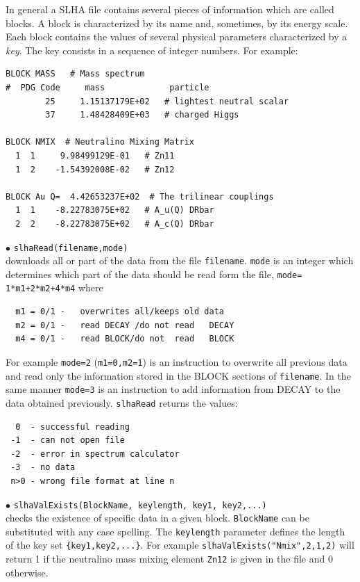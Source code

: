 \documentclass[12pt,a4paper]{article}
\begin{document}
In general a SLHA file contains several pieces of information 
which are called blocks. A block is characterized by its name and,
sometimes, by its energy scale. Each block contains the values of several physical parameters 
characterized by a {\it key}. The  key consists in a sequence of 
integer numbers. For example:
{\small
\begin{verbatim}
BLOCK MASS   # Mass spectrum
#  PDG Code     mass             particle
        25     1.15137179E+02   # lightest neutral scalar
        37     1.48428409E+03   # charged Higgs
  
BLOCK NMIX  # Neutralino Mixing Matrix
  1  1     9.98499129E-01   # Zn11
  1  2    -1.54392008E-02   # Zn12

BLOCK Au Q=  4.42653237E+02  # The trilinear couplings
  1  1    -8.22783075E+02   # A_u(Q) DRbar
  2  2    -8.22783075E+02   # A_c(Q) DRbar
\end{verbatim}
}  

\noindent
$\bullet$ \verb|slhaRead(filename,mode)|\\
downloads all or  part of the data  from the file \verb|filename|.
\verb|mode| is an integer which determines which part of the data should be read form the file, 
\verb|mode= 1*m1+2*m2+4*m4|  where
\begin{verbatim}
  m1 = 0/1 -   overwrites all/keeps old data                                                                                
  m2 = 0/1 -   read DECAY /do not read   DECAY
  m4 = 0/1 -   read BLOCK/do not  read   BLOCK
\end{verbatim}
For example \verb|mode=2| (\verb|m1=0,m2=1|) is an instruction to overwrite all previous data and 
read only the information stored in the BLOCK sections of
\verb|filename|. In the same manner \verb|mode=3| is an instruction to add information from DECAY 
to the data obtained previously. \verb|slhaRead| returns the values:
\begin{verbatim}
  0  - successful reading
 -1  - can not open file
 -2  - error in spectrum calculator
 -3  - no data
 n>0 - wrong file format at line n
\end{verbatim}
%
\noindent
$\bullet$ \verb|slhaValExists(BlockName, keylength, key1, key2,...)|\\
checks the existence of specific data in a given block. 
\verb|BlockName| can  be substituted with any case spelling.
The \verb|keylength| parameter defines the length of the key set
\verb|{key1,key2,...}|. 
For example
     \verb|slhaValExists("Nmix",2,1,2)|
will return 1 if the neutralino mass mixing element \verb|Zn12| is given in the file and 
0 otherwise.
\end{document}
